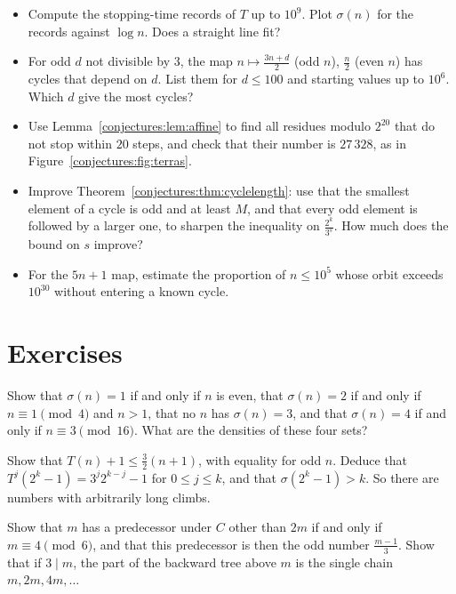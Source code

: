 \begin{itemize}
\item Compute the stopping-time records of $T$ up to $10^9$. Plot $\sigma(n)$ for the records against $\log n$. Does a straight line fit?
\item For odd $d$ not divisible by $3$, the map $n\mapsto\frac{3n+d}2$ (odd $n$), $\frac n2$ (even $n$) has cycles that depend on $d$. List them for
$d\le100$ and starting values up to $10^6$. Which $d$ give the most cycles?
\item Use Lemma~\ref{conjectures:lem:affine} to find all residues modulo $2^{20}$ that do not stop within $20$ steps, and check that their number is $27\,328$, as in
Figure~\ref{conjectures:fig:terras}.
\item Improve Theorem~\ref{conjectures:thm:cyclelength}: use that the smallest element of a cycle is odd and at least $M$, and that every odd element is followed by a
larger one, to sharpen the inequality on $\frac{2^k}{3^s}$. How much does the bound on $s$ improve?
\item For the $5n+1$ map, estimate the proportion of $n\le10^5$ whose orbit exceeds $10^{30}$ without entering a known cycle.
\end{itemize}

\section{Exercises}

\begin{exercise}[$\star$]\label{conjectures:ex:stopsmall}
Show that $\sigma(n)=1$ if and only if $n$ is even, that $\sigma(n)=2$ if and only if $n\equiv1\pmod4$ and $n>1$, that no $n$ has $\sigma(n)=3$, and that
$\sigma(n)=4$ if and only if $n\equiv3\pmod{16}$. What are the densities of these four sets?
\end{exercise}

\begin{exercise}[$\star$]\label{conjectures:ex:climb}
Show that $T(n)+1\le\frac32(n+1)$, with equality for odd $n$. Deduce that $T^j(2^k-1)=3^j2^{k-j}-1$ for $0\le j\le k$, and that $\sigma(2^k-1)>k$. So there
are numbers with arbitrarily long climbs.
\end{exercise}

\begin{exercise}[$\star$]\label{conjectures:ex:backward}
Show that $m$ has a predecessor under $C$ other than $2m$ if and only if $m\equiv4\pmod6$, and that this predecessor is then the odd number $\frac{m-1}3$.
Show that if $3\mid m$, the part of the backward tree above $m$ is the single chain $m,2m,4m,\dots$
\end{exercise}

